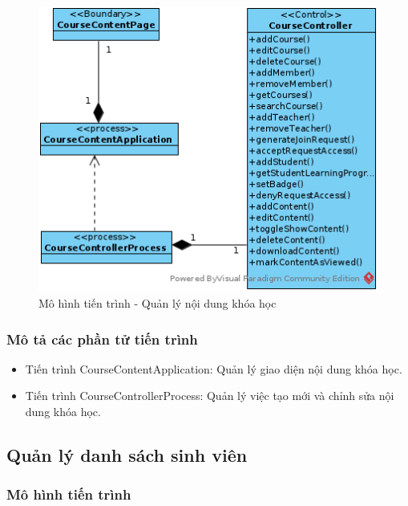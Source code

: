 \documentclass[./../main.tex]{subfiles}
\begin{document}
\begin{figure}[H]
	\centering
	\includegraphics[width=\linewidth]{./images/pv_manage_contentcourse.png}
\caption{Mô hình tiến trình - Quản lý nội dung khóa học}

\end{figure}

\subsubsection{Mô tả các phần tử tiến trình}
\begin{itemize}
	\item Tiến trình CourseContentApplication: Quản lý giao diện nội dung khóa học.
	\item Tiến trình CourseControllerProcess: Quản lý việc tạo mới và chỉnh sửa nội dung khóa học.
\end{itemize}

\subsection{Quản lý danh sách sinh viên}

\subsubsection{Mô hình tiến trình}
\end{document}
